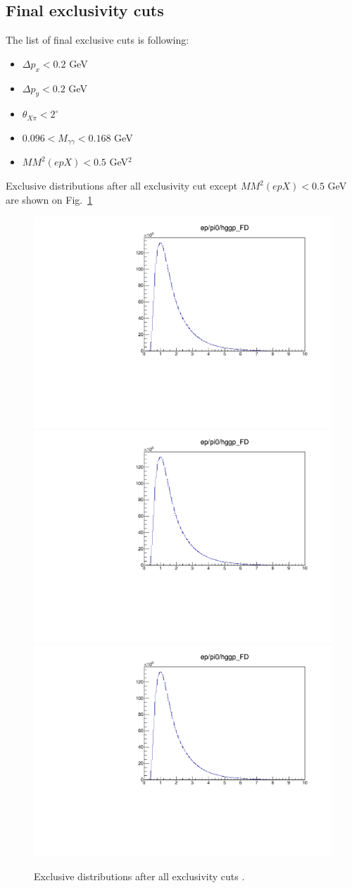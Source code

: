 \clearpage

\subsection{Final exclusivity cuts}

The list of final exclusive cuts is following:
\begin{itemize}
	\item $\Delta p_x<0.2$ GeV
	\item $\Delta p_y<0.2$ GeV
	\item $\theta_{X\pi}<2^\circ$
	\item $0.096<M_{\gamma\gamma}<0.168$ GeV
	\item $MM^2(epX)<0.5$ GeV$^2$
\end{itemize}

Exclusive distributions after all exclusivity cut except $MM^2(epX)<0.5$ GeV are shown on Fig.~\ref{fig:finalexclusive}

\begin{figure}[hbt]
	\centering
	
	\includegraphics[page=82,width=0.32\linewidth]{Chapters/Ch4-BaseAnalysis/1_Exclusivity_Cuts/figures/eppi0.exclusive.pdf}
	\includegraphics[page=83,width=0.32\linewidth]{Chapters/Ch4-BaseAnalysis/1_Exclusivity_Cuts/figures/eppi0.exclusive.pdf}
	\includegraphics[page=84,width=0.32\linewidth]{Chapters/Ch4-BaseAnalysis/1_Exclusivity_Cuts/figures/eppi0.exclusive.pdf}
	\caption{Exclusive distributions after all exclusivity cuts .}
	\label{fig:finalexclusive}
\end{figure}

